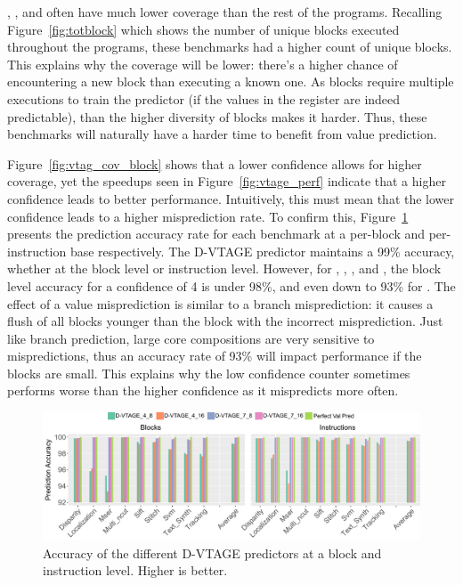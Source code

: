 , ,  and  often have much lower coverage than the rest of the programs.
Recalling Figure~\ref{fig:totblock} which shows the number of unique blocks executed throughout the programs, these benchmarks had a higher count of unique blocks.
This explains why the coverage will be lower: there's a higher chance of encountering a new block than executing a known one.
As blocks require multiple executions to train the predictor (if the values in the register are indeed predictable), than the higher diversity of blocks makes it harder.
Thus, these benchmarks will naturally have a harder time to benefit from value prediction.

Figure~\ref{fig:vtag_cov_block} shows that a lower confidence allows for higher coverage, yet the speedups seen in Figure~\ref{fig:vtage_perf} indicate that a higher confidence leads to better performance.
Intuitively, this must mean that the lower confidence leads to a higher misprediction rate.
To confirm this, Figure~\ref{fig:vtag_accuracy_block} presents the prediction accuracy rate for each benchmark at a per-block and per-instruction base respectively.
The D-VTAGE predictor maintains a 99\% accuracy, whether at the block level or instruction level.
However, for , , ,  and , the block level accuracy for a confidence of 4 is under 98\%, and even down to 93\% for .
The effect of a value misprediction is similar to a branch misprediction: it causes a flush of all blocks younger than the block with the incorrect misprediction.
Just like branch prediction, large core compositions are very sensitive to mispredictions, thus an accuracy rate of 93\% will impact performance if the blocks are small.
This explains why the low confidence counter sometimes performs worse than the higher confidence as it mispredicts more often.

\begin{figure}[t]
    \centering
    \includegraphics[width=1\textwidth]{chapter3/graphics/predAcc.pdf}
    \caption{Accuracy of the different D-VTAGE predictors at a block and instruction level. Higher is better.}
    \label{fig:vtag_accuracy_block}
	\vspace{1em}
\end{figure}
